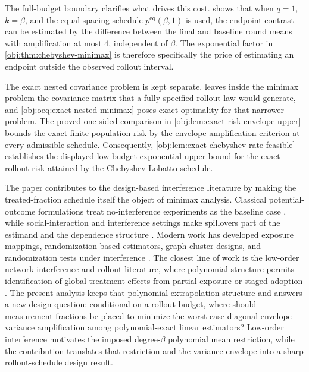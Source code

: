 \documentclass[11pt]{article}
\begin{document}
The full-budget boundary clarifies what drives this cost.  shows that when \(q=1\), \(k=\beta\), and the equal-spacing schedule \(p^{\mathrm{eq}}(\beta,1)\) is used, the endpoint contrast can be estimated by the difference between the final and baseline round means with amplification at most \(4\), independent of \(\beta\). The exponential factor in \cref{obj:thm:chebyshev-minimax} is therefore specifically the price of estimating an endpoint outside the observed rollout interval.

The exact nested covariance problem is kept separate.  leaves inside the minimax problem the covariance matrix that a fully specified rollout law would generate, and \cref{obj:oeq:exact-nested-minimax} poses exact optimality for that narrower problem. The proved one-sided comparison in \cref{obj:lem:exact-risk-envelope-upper} bounds the exact finite-population risk by the envelope amplification criterion at every admissible schedule. Consequently, \cref{obj:lem:exact-chebyshev-rate-feasible} establishes the displayed low-budget exponential upper bound for the exact rollout risk attained by the Chebyshev-Lobatto schedule.

The paper contributes to the design-based interference literature by making the treated-fraction schedule itself the object of minimax analysis. Classical potential-outcome formulations treat no-interference experiments as the baseline case \citep{rubin1974,imbens2015}, while social-interaction and interference settings make spillovers part of the estimand and the dependence structure \citep{manski1993,manski2013}. Modern work has developed exposure mappings, randomization-based estimators, graph cluster designs, and randomization tests under interference \citep{aronow2017,savje2017,eckles2017,ugander2013,athey2018,basse2019,puelz2019}. The closest line of work is the low-order network-interference and rollout literature, where polynomial structure permits identification of global treatment effects from partial exposure or staged adoption \citep{cortez2022,cortezrodriguez2022,cortezrodriguez2024,eichhorn2024}. The present analysis keeps that polynomial-extrapolation structure and answers a new design question: conditional on a rollout budget, where should measurement fractions be placed to minimize the worst-case diagonal-envelope variance amplification among polynomial-exact linear estimators? Low-order interference motivates the imposed degree-\(\beta\) polynomial mean restriction, while the contribution translates that restriction and the variance envelope into a sharp rollout-schedule design result.
\end{document}
